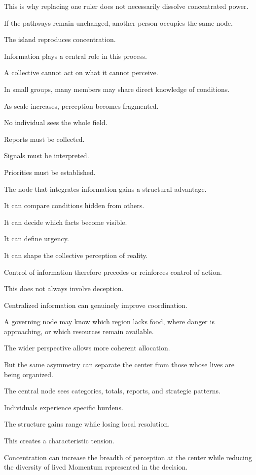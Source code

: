 This is why replacing one ruler does not necessarily dissolve concentrated power.

If the pathways remain unchanged, another person occupies the same node.

The island reproduces concentration.

Information plays a central role in this process.

A collective cannot act on what it cannot perceive.

In small groups, many members may share direct knowledge of conditions.

As scale increases, perception becomes fragmented.

No individual sees the whole field.

Reports must be collected.

Signals must be interpreted.

Priorities must be established.

The node that integrates information gains a structural advantage.

It can compare conditions hidden from others.

It can decide which facts become visible.

It can define urgency.

It can shape the collective perception of reality.

Control of information therefore precedes or reinforces control of action.

This does not always involve deception.

Centralized information can genuinely improve coordination.

A governing node may know which region lacks food, where danger is approaching, or which resources remain available.

The wider perspective allows more coherent allocation.

But the same asymmetry can separate the center from those whose lives are being organized.

The central node sees categories, totals, reports, and strategic patterns.

Individuals experience specific burdens.

The structure gains range while losing local resolution.

This creates a characteristic tension.

Concentration can increase the breadth of perception at the center while reducing the diversity of lived Momentum represented in the decision.

